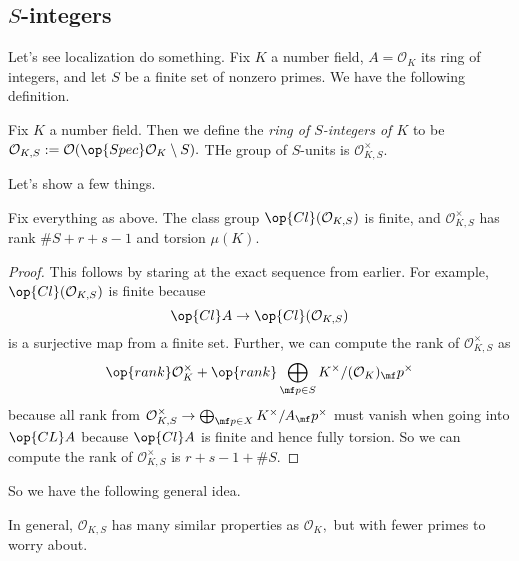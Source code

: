 \documentclass[../notes.tex]{subfiles}
\begin{document}
\subsection{\texorpdfstring{$S$}{}-integers}
Let's see localization do something. Fix $K$ a number field, $A=\mathcal O_K$ its ring of integers, and let $S$ be a finite set of nonzero primes. We have the following definition.
\begin{definition}
    Fix $K$ a number field. Then we define the \textit{ring of $S$-integers of $K$} to be $\mathcal O_{K,S}:=\mathcal O(\op{Spec}\mathcal O_K\setminus S).$ THe group of $S$-units is $\mathcal O_{K,S}^\times.$
\end{definition}
Let's show a few things.
\begin{proposition}
    Fix everything as above. The class group $\op{Cl}(\mathcal O_{K,S})$ is finite, and $\mathcal O_{K,S}^\times$ has rank $\#S+r+s-1$ and torsion $\mu(K).$
\end{proposition}
\begin{proof}
    This follows by staring at the exact sequence from earlier. For example, $\op{Cl}(\mathcal O_{K,S})$ is finite because
    \[\op{Cl}A\to\op{Cl}(\mathcal O_{K,S})\]
    is a surjective map from a finite set. Further, we can compute the rank of $\mathcal O_{K,S}^\times$ as
    \[\op{rank}\mathcal O_K^\times+\op{rank}\bigoplus_{\mf p\in S}K^\times/(\mathcal O_K)_\mf p^\times\]
    because all rank from $\mathcal O_{K,S}^\times\to\bigoplus_{\mf p\in X}K^\times/A_\mf p^\times$ must vanish when going into $\op{CL}A$ because $\op{Cl}A$ is finite and hence fully torsion. So we can compute the rank of $\mathcal O_{K,S}^\times$ is $r+s-1+\#S.$
\end{proof}
So we have the following general idea.
\begin{idea}
    In general, $\mathcal O_{K,S}$ has many similar properties as $\mathcal O_K,$ but with fewer primes to worry about.
\end{idea}
\end{document}
